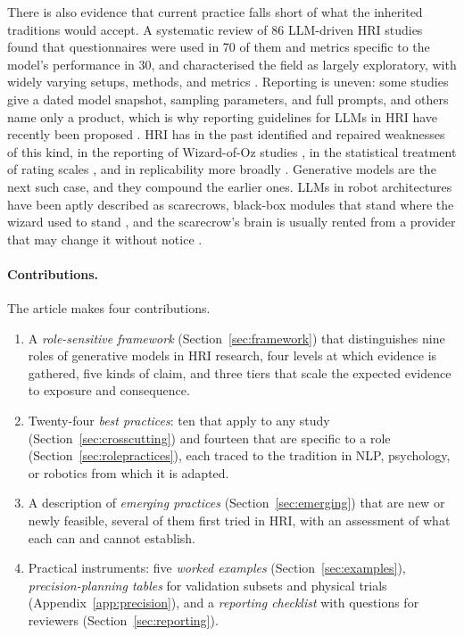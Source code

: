 There is also evidence that current practice falls short of what the
inherited traditions would accept. A systematic review of 86 LLM-driven HRI
studies found that questionnaires were used in 70 of them and metrics
specific to the model's performance in 30, and characterised the field as
largely exploratory, with widely varying setups, methods, and metrics
\cite{wang2026how}. Reporting is uneven: some studies give a dated model
snapshot, sampling parameters, and full prompts, and others name only a
product, which is why reporting guidelines for LLMs in HRI have recently
been proposed \cite{williams2024scarecrows,matuszek2026reporting,
ashok2026why}. HRI has in
the past identified and repaired weaknesses of this kind, in the reporting of
Wizard-of-Oz studies \cite{riek2012wizard}, in the statistical treatment of
rating scales \cite{schrum2023concerning}, and in replicability more broadly
\cite{gunes2022reproducibility,leichtmann2022crisis}. Generative models are
the next such case, and they compound the earlier ones. LLMs in robot
architectures have been aptly described as scarecrows, black-box modules
that stand where the wizard used to stand \cite{williams2024scarecrows},
and the scarecrow's brain is usually rented from a provider that may change
it without notice \cite{chen2024how}.

\paragraph{Contributions.} The article makes four contributions.
\begin{enumerate}[leftmargin=1.6em]
\item A \emph{role-sensitive framework} (Section~\ref{sec:framework}) that
distinguishes nine roles of generative models in HRI research, four levels at
which evidence is gathered, five kinds of claim, and three tiers that scale
the expected evidence to exposure and consequence.
\item Twenty-four \emph{best practices}: ten that apply to any study
(Section~\ref{sec:crosscutting}) and fourteen that are specific to a role
(Section~\ref{sec:rolepractices}), each traced to the tradition in NLP,
psychology, or robotics from which it is adapted.
\item A description of \emph{emerging practices} (Section~\ref{sec:emerging})
that are new or newly feasible, several of them first tried in HRI, with an
assessment of what each can and cannot establish.
\item Practical instruments: five \emph{worked examples}
(Section~\ref{sec:examples}), \emph{precision-planning tables} for validation
subsets and physical trials (Appendix~\ref{app:precision}), and a
\emph{reporting checklist} with questions for reviewers
(Section~\ref{sec:reporting}).
\end{enumerate}

